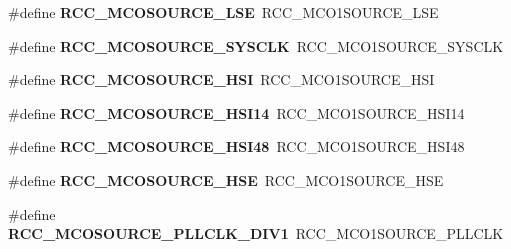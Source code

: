\begin{DoxyCompactItemize}
\mbox{\label{group___h_a_l___r_c_c___aliased_ga830cfeba85393f5a5a2743ad0f373834}} 
\#define {\bfseries R\+C\+C\+\_\+\+M\+C\+O\+S\+O\+U\+R\+C\+E\+\_\+\+L\+SE}~R\+C\+C\+\_\+\+M\+C\+O1\+S\+O\+U\+R\+C\+E\+\_\+\+L\+SE
\item 
\mbox{\label{group___h_a_l___r_c_c___aliased_ga250215c0f82d63c001f1a19f6baeaee4}} 
\#define {\bfseries R\+C\+C\+\_\+\+M\+C\+O\+S\+O\+U\+R\+C\+E\+\_\+\+S\+Y\+S\+C\+LK}~R\+C\+C\+\_\+\+M\+C\+O1\+S\+O\+U\+R\+C\+E\+\_\+\+S\+Y\+S\+C\+LK
\item 
\mbox{\label{group___h_a_l___r_c_c___aliased_gaf76c21fc91d02a5006b1ad20bb09fb59}} 
\#define {\bfseries R\+C\+C\+\_\+\+M\+C\+O\+S\+O\+U\+R\+C\+E\+\_\+\+H\+SI}~R\+C\+C\+\_\+\+M\+C\+O1\+S\+O\+U\+R\+C\+E\+\_\+\+H\+SI
\item 
\mbox{\label{group___h_a_l___r_c_c___aliased_gaf44dc4cc77e850c96fc1fee93a74a838}} 
\#define {\bfseries R\+C\+C\+\_\+\+M\+C\+O\+S\+O\+U\+R\+C\+E\+\_\+\+H\+S\+I14}~R\+C\+C\+\_\+\+M\+C\+O1\+S\+O\+U\+R\+C\+E\+\_\+\+H\+S\+I14
\item 
\mbox{\label{group___h_a_l___r_c_c___aliased_ga31f756beeaf0bcc8082ec46ff42cfb2c}} 
\#define {\bfseries R\+C\+C\+\_\+\+M\+C\+O\+S\+O\+U\+R\+C\+E\+\_\+\+H\+S\+I48}~R\+C\+C\+\_\+\+M\+C\+O1\+S\+O\+U\+R\+C\+E\+\_\+\+H\+S\+I48
\item 
\mbox{\label{group___h_a_l___r_c_c___aliased_ga4e6a5a2c5b38b11470c34f9adc4adb5a}} 
\#define {\bfseries R\+C\+C\+\_\+\+M\+C\+O\+S\+O\+U\+R\+C\+E\+\_\+\+H\+SE}~R\+C\+C\+\_\+\+M\+C\+O1\+S\+O\+U\+R\+C\+E\+\_\+\+H\+SE
\item 
\mbox{\label{group___h_a_l___r_c_c___aliased_ga962bbca249325c15747b0b49c47a378c}} 
\#define {\bfseries R\+C\+C\+\_\+\+M\+C\+O\+S\+O\+U\+R\+C\+E\+\_\+\+P\+L\+L\+C\+L\+K\+\_\+\+D\+I\+V1}~R\+C\+C\+\_\+\+M\+C\+O1\+S\+O\+U\+R\+C\+E\+\_\+\+P\+L\+L\+C\+LK
\item 
\mbox{\label{group___h_a_l___r_c_c___aliased_ga8f2e0c2303a5c5c53a64a60f6900b09e}} 

\end{DoxyCompactItemize}
